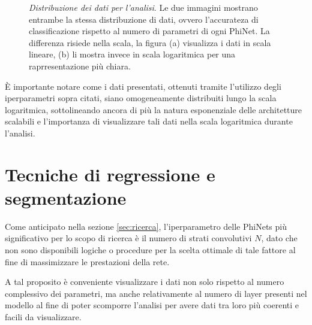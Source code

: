 \begin{figure}[ht]
    \centering
    \quad
    \quad
    \caption{\textit{Distribuzione dei dati per l'analisi}. Le due immagini mostrano entrambe la stessa distribuzione di dati, ovvero l'accurateza di classificazione rispetto al numero di parametri di ogni PhiNet. La differenza risiede nella scala, la figura (a) visualizza i dati in scala lineare, (b) li mostra invece in scala logaritmica per una raprresentazione più chiara.}
    \label{fig:dati}
\end{figure}

È importante notare come i dati presentati, ottenuti tramite l'utilizzo degli iperparametri sopra citati, siano omogeneamente distribuiti lungo la scala logaritmica, sottolineando ancora di più la natura esponenziale delle architetture scalabili e l'importanza di visualizzare tali dati nella scala logaritmica durante l'analisi.

\iffalse
SCALETTA
\begin{itemize}
    \item spazio di ricerca numero parametri [..., ...]
    \item scala logaritmica
    \item configurazioni iperparametri
    \item quantità di dati
    \item ...
    \item checkpoint per linear probe
\end{itemize}
\fi


\section{Tecniche di regressione e segmentazione}
\label{sec:regressione}

Come anticipato nella sezione \ref{sec:ricerca}, l'iperparametro delle PhiNets più significativo per lo scopo di ricerca è il numero di strati convolutivi $N$, dato che non sono disponibili logiche o procedure per la scelta ottimale di tale fattore al fine di massimizzare le prestazioni della rete.

A tal proposito è conveniente visualizzare i dati non solo rispetto al numero complessivo dei parametri, ma anche relativamente al numero di layer presenti nel modello al fine di poter scomporre l'analisi per avere dati tra loro più coerenti e facili da visualizzare.


